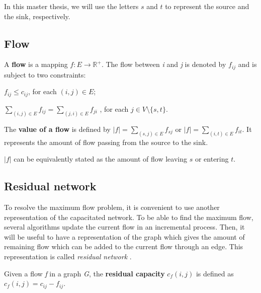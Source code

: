 In this master thesis, we will use the letters $s$ and $t$ to represent the source and the sink, respectively.

\subsection{Flow}
\begin{definition}
\label{flow}
A \textbf{flow} is a mapping $f: E \to \mathbb{R}^{+}$. The flow between \textit{i} and \textit{j} is denoted by $f_{ij}$ and is subject to two constraints:
\indent
\begin{description}
	\label{cap_constraint}
	\item[Capacity constraint] $f_{ij} \leq c_{ij}$, for each $(i, j) \in E$;
	\label{flow_constraint}
	\item[Flow conservation constraint] $\sum\limits_{(i, j) \in E} f_{ij} = \sum\limits_{(j, i) \in E} f_{ji}$ , for each $j \in V \setminus \{s, t\}$.
\end{description}
\end{definition}

\begin{definition}
\label{vflow}
The \textbf{value of a flow} is defined by $\left\vert{f}\right\vert = \sum\limits_{(s,j) \in E} f_{sj}$ or $\left\vert{f}\right\vert = \sum\limits_{(i,t) \in E} f_{it}$. It represents the amount of flow passing from the source to the sink.
\end{definition}

$\left\vert{f}\right\vert$ can be equivalently stated as the amount of flow leaving $s$ or entering $t$.

\subsection{Residual network} 
To resolve the maximum flow problem, it is convenient to use another representation of the capacitated network. To be able to find the maximum flow, several algorithms update the current flow in an incremental process. Then, it will be useful to have a representation of the graph which gives the amount of remaining flow which can be added to the current flow through an edge. This representation is called \textit{residual network} \cite{networkflows}.
\begin{definition}
\label{rcapacity}
Given a flow \textit{f} in a graph \textit{G}, the \textbf{residual capacity} $c_f (i,j)$ is defined as $c_f (i,j) = c_{ij} - f_{ij}$.
\end{definition}


